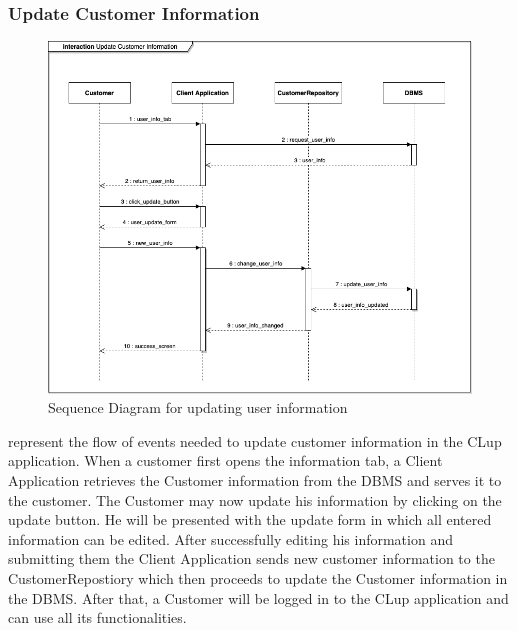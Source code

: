 \subsubsection{Update Customer Information}
\begin{figure}[H]
    \centering
    \includegraphics[height=0.4\textwidth]{Images/SequenceDiagrams/UpdateCustomerInformation.png}
    \caption{Sequence Diagram for updating user information}
    \label{fig:SDUpdateCustomerInformation}
\end{figure}
 represent the flow of events needed to update customer information in the CLup application.
When a customer first opens the information tab, a Client Application retrieves the Customer information from the DBMS and serves it to the customer.
The Customer may now update his information by clicking on the update button. He will be presented with the update form in which all entered information can be edited.
After successfully editing his information and submitting them the Client Application sends new customer information to the CustomerRepostiory which then proceeds to update the Customer information in the DBMS.
After that, a Customer will be logged in to the CLup application and can use all its functionalities.



